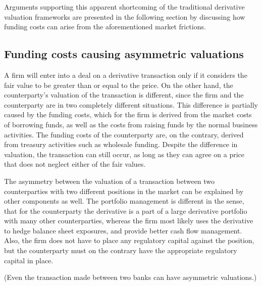 \documentclass[main.tex]{subfiles}
\begin{document}
        Arguments supporting this apparent shortcoming of the traditional derivative valuation frameworks are presented in the following section by discussing how funding costs can arise from the aforementioned market frictions.
    
    \subsection{Funding costs causing asymmetric valuations}
        A firm will enter into a deal on a derivative transaction
        only if it considers the fair value to be greater than or equal to the price.
        On the other hand, the counterparty's valuation of the transaction is different,
        since the firm and the counterparty are in two completely different situations.
        This difference is partially caused by the funding costs,
        which for the firm is derived from the market costs of borrowing funds,
        as well as the costs from raising funds by the normal business activities.
        The funding costs of the counterparty are, on the contrary, derived from treasury activities such as wholesale funding.
        Despite the difference in valuation, the transaction can still occur,
        as long as they can agree on a price that does not neglect either of the fair values.

        The asymmetry between the valuation of a transaction between two counterparties with two different positions in the market can be explained by other components as well.
        The portfolio management is different in the sense,
        that for the counterparty the derivative is a part of a large derivative portfolio with many other counterparties,
        whereas the firm most likely uses the derivative to hedge balance sheet exposures,
        and provide better cash flow management.
        Also, the firm does not have to place any regulatory capital against the position,
        but the counterparty must on the contrary have the appropriate regulatory capital in place.

        (Even the transaction made between two banks can have asymmetric valuations.)
\end{document}
